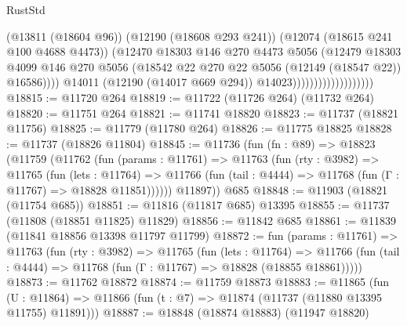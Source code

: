 \begin{lexlean}{RustStd}
\begin{coremodule}
                                            (@13811 (@18604 @96))
                                            (@12190 (@18608 @293 @241))
                                            (@12074 (@18615 @241 @100 @4688 @4473))
                                            (@12470
                                              @18303
                                              @146
                                              @270
                                              @4473
                                              @5056
                                              (@12479
                                                @18303
                                                @4099
                                                @146
                                                @270
                                                @5056
                                                (@18542
                                                  @22
                                                  @270
                                                  @22
                                                  @5056
                                                  (@12149 (@18547 @22))
                                                  @16586))))
                                          @14011
                                          (@12190 (@14017 @669 @294))
                                          @14023)))))))))))))))))))
@18815 := @11720 @264
@18819 := @11722 (@11726 @264) (@11732 @264)
@18820 := @11751 @264
@18821 := @11741 @18820
@18823 := @11737 (@18821 @11756)
@18825 := @11779 (@11780 @264)
@18826 := @11775 @18825
@18828 := @11737 (@18826 @11804)
@18845 := @11736
    (fun (fn : @89) =>
    @18823
      (@11759
        (@11762
          (fun (params : @11761) =>
          @11763
            (fun (rty : @3982) =>
            @11765
              (fun (lets : @11764) =>
              @11766 (fun (tail : @4444) => @11768 (fun (Γ : @11767) => @18828 @11851))))))
        @11897))
    @685
@18848 := @11903 (@18821 (@11754 @685))
@18851 := @11816 (@11817 @685) @13395
@18855 := @11737 (@11808 (@18851 @11825) @11829)
@18856 := @11842 @685
@18861 := @11839 (@11841 @18856 @13398 @11797 @11799)
@18872 := fun (params : @11761) =>
  @11763
    (fun (rty : @3982) =>
    @11765
      (fun (lets : @11764) =>
      @11766 (fun (tail : @4444) => @11768 (fun (Γ : @11767) => @18828 (@18855 @18861)))))
@18873 := @11762 @18872
@18874 := @11759 @18873
@18883 := @11865
    (fun (U : @11864) => @11866 (fun (t : @7) => @11874 (@11737 (@11880 @13395 @11755) @11891)))
@18887 := @18848 (@18874 @18883) (@11947 @18820)

\end{coremodule}
\end{lexlean}
